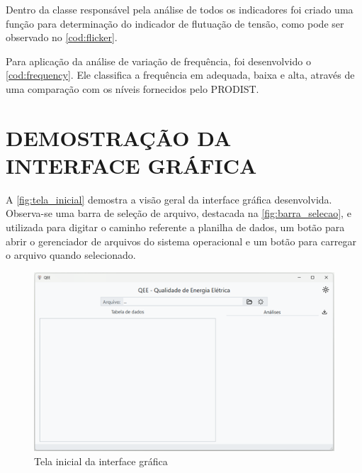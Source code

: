 \begin{codigo}
\end{codigo}

Dentro da classe responsável pela análise de todos os indicadores foi criado uma função para determinação do indicador de flutuação de tensão, como pode ser observado no \autoref{cod:flicker}.

\begin{codigo}
\end{codigo}


Para aplicação da análise de variação de frequência, foi desenvolvido o \autoref{cod:frequency}. Ele classifica a frequência em adequada, baixa e alta, através de uma comparação com os níveis fornecidos pelo PRODIST.

\begin{codigo}
\end{codigo}

\section{DEMOSTRAÇÃO DA INTERFACE GRÁFICA}

A \autoref{fig:tela_inicial} demostra a visão geral da interface gráfica desenvolvida. Observa-se uma barra de seleção de arquivo, destacada na \autoref{fig:barra_selecao}, e utilizada para digitar o caminho referente a planilha de dados, um botão para abrir o gerenciador de arquivos do sistema operacional e um botão para carregar o arquivo quando selecionado.

\begin{figure}[H]
	\centering
	\caption{Tela inicial da interface gráfica}
	\label{fig:tela_inicial}
	\includegraphics[width=15cm]{illustrations/figures/tela_inicial.png}
\end{figure}

